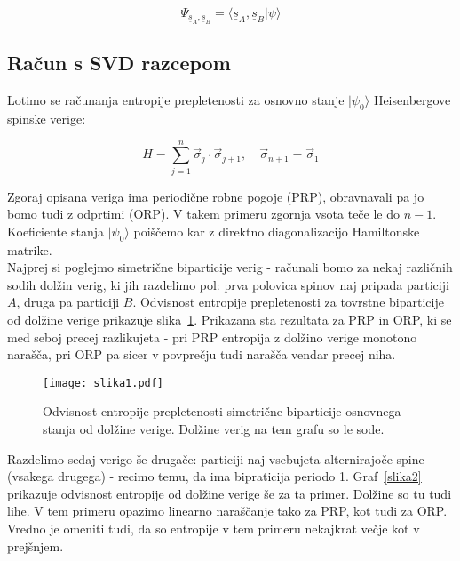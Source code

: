 \documentclass[a4paper]{article}
\newcommand{\ket}[1]{|#1\rangle}
\newcommand{\s}{\sigma}
\newcommand{\vs}{\vec{\s}}
\newcommand{\us}{\underline{s}}
\begin{document}
    \begin{equation}\label{eq18}
        \Psi_{\us_A, \us_B} = \langle \us_A, \us_B \ket{\psi}
    \end{equation}

    \subsection{Račun s SVD razcepom} 

    Lotimo se računanja entropije prepletenosti za osnovno stanje $\ket{\psi_0}$ Heisenbergove spinske verige:
 
    \begin{equation}\label{eq19}
        H = \sum_{j=1}^{n} \vs_j \cdot \vs_{j+1}, \quad \vs_{n+1} = \vs_1
    \end{equation}

    Zgoraj opisana veriga ima periodične robne pogoje (PRP), obravnavali pa jo bomo tudi z odprtimi (ORP).
    V takem primeru zgornja vsota teče le do $n - 1$.
    Koeficiente stanja $\ket{\psi_0}$ poiščemo kar z direktno diagonalizacijo Hamiltonske matrike. \\

    Najprej si poglejmo simetrične biparticije verig - računali bomo za nekaj različnih sodih dolžin verig, ki jih razdelimo pol: prva polovica
    spinov naj pripada particiji $A$, druga pa particiji $B$. Odvisnost entropije prepletenosti za tovrstne biparticije od dolžine verige
    prikazuje slika~\ref{slika1}. Prikazana sta rezultata za PRP in ORP, ki se med seboj precej razlikujeta - pri PRP entropija z dolžino
    verige monotono narašča, pri ORP pa sicer v povprečju tudi narašča vendar precej niha.

    \begin{figure}
        \centering
        \texttt{[image: slika1.pdf]}
        \caption{Odvisnost entropije prepletenosti simetrične biparticije osnovnega stanja od dolžine verige. Dolžine verig na tem grafu so le sode.}
        \label{slika1}
    \end{figure}

    Razdelimo sedaj verigo še drugače: particiji naj vsebujeta alternirajoče spine (vsakega drugega) - recimo temu, da ima bipraticija periodo 1.
    Graf~\ref{slika2} prikazuje odvisnost entropije od dolžine verige še za ta primer. Dolžine so tu tudi lihe. V tem primeru opazimo linearno
    naraščanje tako za PRP, kot tudi za ORP. Vredno je omeniti tudi, da so entropije v tem primeru nekajkrat večje kot v prejšnjem.
\end{document}
